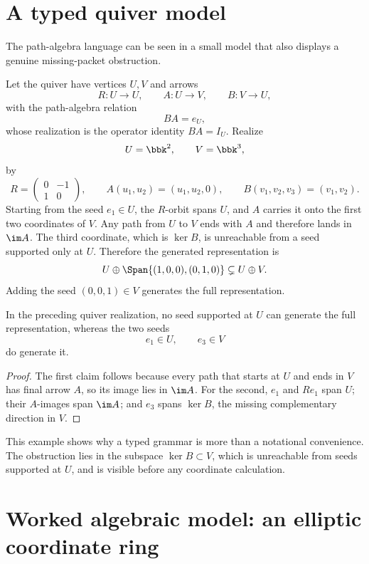 \section{A typed quiver model}

The path-algebra language can be seen in a small model that also displays a genuine missing-packet obstruction.

Let the quiver have vertices $U,V$ and arrows
\[
R:U\to U,
\qquad
A:U\to V,
\qquad
B:V\to U,
\]
with the path-algebra relation
\[
BA=e_U,
\]
whose realization is the operator identity $BA=I_U$.
Realize
\[
U=\bbk^2,
\qquad
V=\bbk^3,
\]
by
\[
R=
\begin{pmatrix}0&-1\\1&0\end{pmatrix},
\qquad
A(u_1,u_2)=(u_1,u_2,0),
\qquad
B(v_1,v_2,v_3)=(v_1,v_2).
\]
Starting from the seed $e_1\in U$, the $R$-orbit spans $U$, and $A$ carries it onto the first two coordinates of $V$. Any path from $U$ to $V$ ends with $A$ and therefore lands in $\im A$. The third coordinate, which is $\ker B$, is unreachable from a seed supported only at $U$. Therefore the generated representation is
\[
U\oplus\Span\{(1,0,0),(0,1,0)\}
\subsetneq U\oplus V.
\]
Adding the seed $(0,0,1)\in V$ generates the full representation.

\begin{proposition}
\label{prop:typed-reachability}
In the preceding quiver realization, no seed supported at $U$ can generate the full representation, whereas the two seeds
\[
e_1\in U,
\qquad
e_3\in V
\]
do generate it.
\end{proposition}

\begin{proof}
The first claim follows because every path that starts at $U$ and ends in $V$ has final arrow $A$, so its image lies in $\im A$. For the second, $e_1$ and $Re_1$ span $U$; their $A$-images span $\im A$; and $e_3$ spans $\ker B$, the missing complementary direction in $V$.
\end{proof}

This example shows why a typed grammar is more than a notational convenience. The obstruction lies in the subspace $\ker B\subset V$, which is unreachable from seeds supported at $U$, and is visible before any coordinate calculation.

\section{Worked algebraic model: an elliptic coordinate ring}

